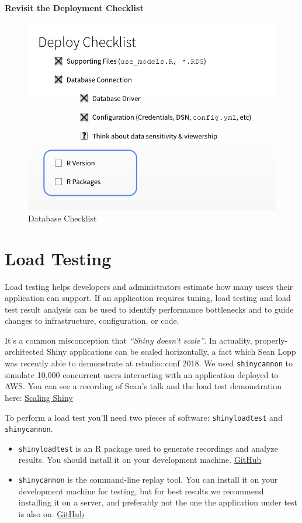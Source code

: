 \documentclass[]{book}
\providecommand{\tightlist}{%
  \setlength{\itemsep}{0pt}\setlength{\parskip}{0pt}}
\theoremstyle{definition}
\theoremstyle{definition}
\theoremstyle{definition}
\theoremstyle{remark}
\begin{document}
\textbf{Revisit the Deployment Checklist}

\begin{figure}
\centering
\includegraphics{imgs/databases/database-checklist.png}
\caption{Database Checklist}
\end{figure}

\hypertarget{load-testing}{%
\chapter{Load Testing}\label{load-testing}}

Load testing helps developers and administrators estimate how many users
their application can support. If an application requires tuning, load
testing and load test result analysis can be used to identify
performance bottlenecks and to guide changes to infrastructure,
configuration, or code.

It's a common misconception that \emph{``Shiny doesn't scale''}. In
actuality, properly-architected Shiny applications can be scaled
horizontally, a fact which Sean Lopp was recently able to demonstrate at
rstudio::conf 2018. We used \texttt{shinycannon} to simulate 10,000
concurrent users interacting with an application deployed to AWS. You
can see a recording of Sean's talk and the load test demonstration here:
\href{https://www.rstudio.com/resources/videos/scaling-shiny/}{Scaling
Shiny}

To perform a load test you'll need two pieces of software:
\texttt{shinyloadtest} and \texttt{shinycannon}.

\begin{itemize}
\tightlist
\item
  \texttt{shinyloadtest} is an R package used to generate recordings and
  analyze results. You should install it on your development machine.
  \href{https://github.com/rstudio/shinyloadtest}{GitHub}
\item
  \texttt{shinycannon} is the command-line replay tool. You can install
  it on your development machine for testing, but for best results we
  recommend installing it on a server, and preferably not the one the
  application under test is also on.
  \href{https://github.com/rstudio/shinycannon}{GitHub}
\end{itemize}
\end{document}
